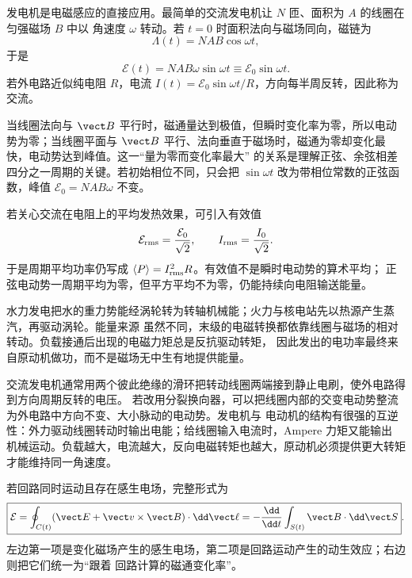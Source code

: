 发电机是电磁感应的直接应用。最简单的交流发电机让 $N$ 匝、面积为 $A$ 的线圈在匀强磁场 $B$ 中以
角速度 $\omega$ 转动。若 $t=0$ 时面积法向与磁场同向，磁链为
\begin{equation}
  \Lambda(t)=NAB\cos\omega t,
\end{equation}
于是
\begin{equation}
  \boxed{\mathcal E(t)=NAB\omega\sin\omega t
  \equiv\mathcal E_0\sin\omega t}.
\end{equation}
若外电路近似纯电阻 $R$，电流 $I(t)=\mathcal E_0\sin\omega t/R$，方向每半周反转，因此称为交流。

当线圈法向与 $\vect B$ 平行时，磁通量达到极值，但瞬时变化率为零，所以电动势为零；当线圈平面与
$\vect B$ 平行、法向垂直于磁场时，磁通为零却变化最快，电动势达到峰值。这一“量为零而变化率最大”
的关系是理解正弦、余弦相差四分之一周期的关键。若初始相位不同，只会把
$\sin\omega t$ 改为带相位常数的正弦函数，峰值 $\mathcal E_0=NAB\omega$ 不变。

若关心交流在电阻上的平均发热效果，可引入有效值
\begin{equation}
  \mathcal E_{\rm rms}=\frac{\mathcal E_0}{\sqrt2},
  \qquad I_{\rm rms}=\frac{I_0}{\sqrt2}.
\end{equation}
于是周期平均功率仍写成 $\langle P\rangle=I_{\rm rms}^2R$。有效值不是瞬时电动势的算术平均；
正弦电动势一周期平均为零，但平方平均不为零，仍能持续向电阻输送能量。

\generatorFigureFaithful

水力发电把水的重力势能经涡轮转为转轴机械能；火力与核电站先以热源产生蒸汽，再驱动涡轮。能量来源
虽然不同，末级的电磁转换都依靠线圈与磁场的相对转动。负载接通后出现的电磁力矩总是反抗驱动转矩，
因此发出的电功率最终来自原动机做功，而不是磁场无中生有地提供能量。

交流发电机通常用两个彼此绝缘的滑环把转动线圈两端接到静止电刷，使外电路得到方向周期反转的电压。
若改用分裂换向器，可以把线圈内部的交变电动势整流为外电路中方向不变、大小脉动的电动势。发电机与
电动机的结构有很强的互逆性：外力驱动线圈转动时输出电能；给线圈输入电流时，Ampere 力矩又能输出
机械运动。负载越大，电流越大，反向电磁转矩也越大，原动机必须提供更大转矩才能维持同一角速度。

若回路同时运动且存在感生电场，完整形式为
\begin{equation}
  \boxed{\mathcal E=\oint_{C(t)}(\vect E+\vect v\times\vect B)\cdot\dd\vect\ell
  =-\frac{\dd}{\dd t}\int_{S(t)}\vect B\cdot\dd\vect S}.
\end{equation}
左边第一项是变化磁场产生的感生电场，第二项是回路运动产生的动生效应；右边则把它们统一为“跟着
回路计算的磁通变化率”。


